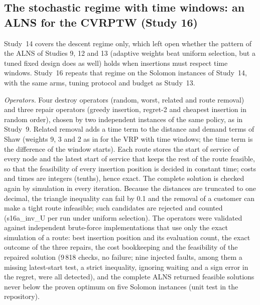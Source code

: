 \subsection{The stochastic regime with time windows: an ALNS for the CVRPTW (Study 16)}\label{sec:s16design}
Study~14 covers the descent regime only, which left open whether the pattern of the ALNS of Studies 9, 12 and 13 (adaptive weights beat uniform selection, but a tuned fixed design does as well) holds when insertions must respect time windows. Study~16 repeats that regime on the Solomon instances of Study~14, with the same arms, tuning protocol and budget as Study~13.

\emph{Operators.} Four destroy operators (random, worst, related and route removal) and three repair operators (greedy insertion, regret-2 and cheapest insertion in random order), chosen by two independent instances of the same policy, as in Study~9. Related removal adds a time term to the distance and demand terms of Shaw (weights 9, 3 and 2 as in \citet{ropke2006} for the VRP with time windows; the time term is the difference of the window starts). Each route stores the start of service of every node and the latest start of service that keeps the rest of the route feasible, so that the feasibility of every insertion position is decided in constant time; costs and times are integers (tenths), hence exact. The complete solution is checked again by simulation in every iteration. Because the distances are truncated to one decimal, the triangle inequality can fail by 0.1 and the removal of a customer can make a tight route infeasible; such candidates are rejected and counted (\num{s16a_inv_U} per run under uniform selection). The operators were validated against independent brute-force implementations that use only the exact simulation of a route: best insertion position and its evaluation count, the exact outcome of the three repairs, the cost bookkeeping and the feasibility of the repaired solution (9\,818 checks, no failure; nine injected faults, among them a missing latest-start test, a strict inequality, ignoring waiting and a sign error in the regret, were all detected), and the complete ALNS returned feasible solutions never below the proven optimum on five Solomon instances (unit test in the repository).

